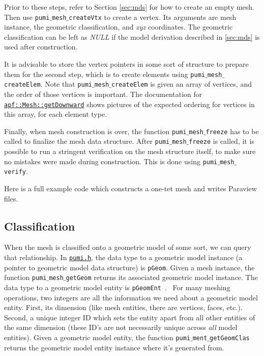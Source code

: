 \documentclass{article}
\begin{document}
Prior to these steps, refer to Section \ref{sec:mds} for
how to create an empty mesh.
Then use \texttt{pumi$\_$mesh$\_$createVtx} to create a vertex.
Its arguments are mesh instance, the geometric classification, and \emph{xyz}
coordinates.
The geometric classification can be left as \emph{NULL} if the model derivation
described in \ref{sec:mds} is used after construction.

It is advisable to store the vertex pointers in some sort
of structure to prepare them for the second step,
which is to create elements using \texttt{pumi$\_$mesh$\_$createElem}.
Note that \texttt{pumi$\_$mesh$\_$createElem} is given an array
of vertices, and the order of those vertices is important.
The documentation for
\href{http://scorec.rpi.edu/~dibanez/core/classapf_1_1Mesh.html#ae9af2075129ffd4553092049d85b276b}{\texttt{apf::Mesh::getDownward}}
shows pictures of the expected ordering for vertices
in this array, for each element type.

Finally, when mesh construction is over, the function
\texttt{pumi$\_$mesh$\_$freeze} has to be called to finalize the mesh data
structure.
After \texttt{pumi$\_$mesh$\_$freeze} is called, it is possible to run
a stringent verification on the mesh structure itself,
to make sure no mistakes were made during construction.
This is done using \texttt{pumi$\_$mesh$\_$verify}.

Here is a full example code which constructs a one-tet
mesh and writes Paraview files.



\subsection{Classification}

When the mesh is classified onto a geometric model of some sort, we
can query that relationship.
In \href{https://github.com/SCOREC/core/blob/master/pumi/pumi.h}
{\texttt{pumi.h}}, the data type to a geometric model instance (a pointer to
geometric model data structure) is \texttt{pGeom}.
Given a mesh instance, the function \texttt{pumi$\_$mesh$\_$getGeom} returns
its associated geometric model instance.
The data type to a geometric model entity is {\texttt{pGeomEnt}}~.
\
For many meshing operations, two integers are all the information
we need about a geometric model entity.
First, its dimension (like mesh entities, there are vertices, faces, etc.).
Second, a unique integer ID which sets the entity apart from
all other entities of the same dimension (these ID's are not necessarily
unique across \emph{all} model entities).
Given a geometric model entity, the function
\texttt{pumi$\_$ment$\_$getGeomClas} returns the geometric model entity
instance where it's generated from.
\end{document}
